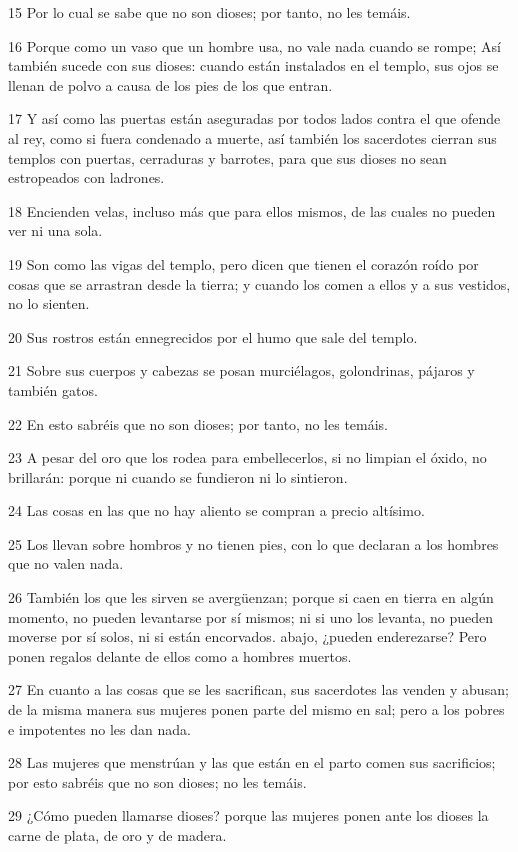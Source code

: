 \par 15 Por lo cual se sabe que no son dioses; por tanto, no les temáis.
\par 16 Porque como un vaso que un hombre usa, no vale nada cuando se rompe; Así también sucede con sus dioses: cuando están instalados en el templo, sus ojos se llenan de polvo a causa de los pies de los que entran.
\par 17 Y así como las puertas están aseguradas por todos lados contra el que ofende al rey, como si fuera condenado a muerte, así también los sacerdotes cierran sus templos con puertas, cerraduras y barrotes, para que sus dioses no sean estropeados con ladrones.
\par 18 Encienden velas, incluso más que para ellos mismos, de las cuales no pueden ver ni una sola.
\par 19 Son como las vigas del templo, pero dicen que tienen el corazón roído por cosas que se arrastran desde la tierra; y cuando los comen a ellos y a sus vestidos, no lo sienten.
\par 20 Sus rostros están ennegrecidos por el humo que sale del templo.
\par 21 Sobre sus cuerpos y cabezas se posan murciélagos, golondrinas, pájaros y también gatos.
\par 22 En esto sabréis que no son dioses; por tanto, no les temáis.
\par 23 A pesar del oro que los rodea para embellecerlos, si no limpian el óxido, no brillarán: porque ni cuando se fundieron ni lo sintieron.
\par 24 Las cosas en las que no hay aliento se compran a precio altísimo.
\par 25 Los llevan sobre hombros y no tienen pies, con lo que declaran a los hombres que no valen nada.
\par 26 También los que les sirven se avergüenzan; porque si caen en tierra en algún momento, no pueden levantarse por sí mismos; ni si uno los levanta, no pueden moverse por sí solos, ni si están encorvados. abajo, ¿pueden enderezarse? Pero ponen regalos delante de ellos como a hombres muertos.
\par 27 En cuanto a las cosas que se les sacrifican, sus sacerdotes las venden y abusan; de la misma manera sus mujeres ponen parte del mismo en sal; pero a los pobres e impotentes no les dan nada.
\par 28 Las mujeres que menstrúan y las que están en el parto comen sus sacrificios; por esto sabréis que no son dioses; no les temáis.
\par 29 ¿Cómo pueden llamarse dioses? porque las mujeres ponen ante los dioses la carne de plata, de oro y de madera.
